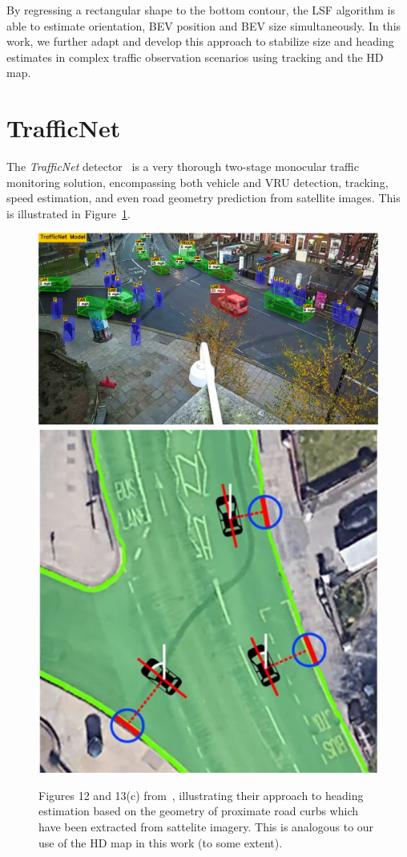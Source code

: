 By regressing a rectangular shape to the bottom contour, the LSF algorithm is able to estimate orientation, BEV position and BEV size simultaneously.
In this work, we further adapt and develop this approach to stabilize size and heading estimates in complex traffic observation scenarios using tracking and the HD map.

\section{TrafficNet}
\label{sec:related-trafficnet}

The \textit{TrafficNet} detector~\cite{rezaei2021traffic} is a very thorough two-stage monocular traffic monitoring solution, encompassing both vehicle and VRU detection, tracking, speed estimation, and even road geometry prediction from satellite images.
This is illustrated in Figure~\ref{fig:related-tranet}.

\begin{figure}[htb]
    \centering
    \includegraphics[width=0.63\linewidth]{figures/tranet}
    \includegraphics[width=0.35\linewidth]{figures/tranet-angle-estimation}
    \caption{Figures 12 and 13(c) from~\cite{rezaei2021traffic}, illustrating their approach to heading estimation based on the geometry of proximate road curbs which have been extracted from sattelite imagery. This is analogous to our use of the HD map in this work (to some extent).}
    \label{fig:related-tranet}
\end{figure}

